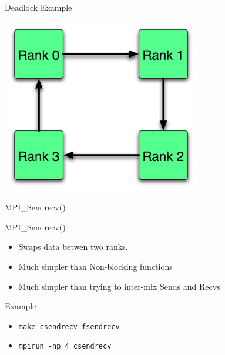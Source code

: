 \documentclass[handout]{beamer}
\begin{document}
\begin{frame}{Deadlock Example}
   \begin{center}\includegraphics[height=3.0in]{deadlock}\end{center}
\end{frame} 
\begin{frame}{MPI\_Sendrecv()}
 \begin{block}{MPI\_Sendrecv()}
  \begin{itemize}
    \item Swaps data betwen two ranks.
    \item Much simpler than Non-blocking functions
    \item Much simpler than trying to inter-mix Sends and Recvs
  \end{itemize}
 \end{block}
 \begin{block}{Example}
  \begin{itemize}
    \item \texttt{make csendrecv fsendrecv}
    \item \texttt{mpirun -np 4 csendrecv}
  \end{itemize}
 \end{block}
\end{frame}
\end{document}
